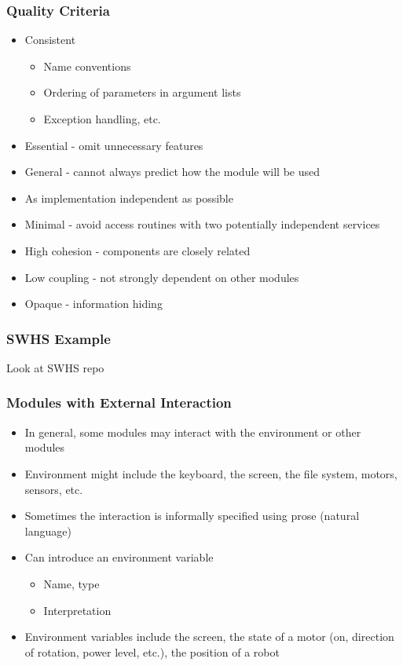 \documentclass[t,12pt,numbers,fleqn]{beamer}
\begin{document}
\begin{frame}

\frametitle{Quality Criteria}

\begin{itemize}
\item Consistent
\begin{itemize}
\item Name conventions
\item Ordering of parameters in argument lists
\item Exception handling, etc.
\end{itemize}
\item Essential - omit unnecessary features
\item General - cannot always predict how the module will be used
\item As implementation independent as possible
\item Minimal - avoid access routines with two potentially independent services
\item High cohesion - components are closely related
\item Low coupling - not strongly dependent on other modules
\item Opaque - information hiding
\end{itemize}

\end{frame}


\begin{frame}

\frametitle{SWHS Example}

Look at SWHS repo

\end{frame}


\begin{frame}
\frametitle{Modules with External Interaction}

\begin{itemize}
\item In general, some modules may interact with the environment or other modules
\item Environment might include the keyboard, the screen, the file system, motors, sensors, etc.
\item Sometimes the interaction is informally specified using prose (natural language)
\item Can introduce an environment variable
\begin{itemize}
\item Name, type
\item Interpretation
\end{itemize}
\item Environment variables include the screen, the state of a motor (on, direction of rotation, power level, etc.),
the position of a robot

\end{itemize}

\end{frame}
\end{document}
